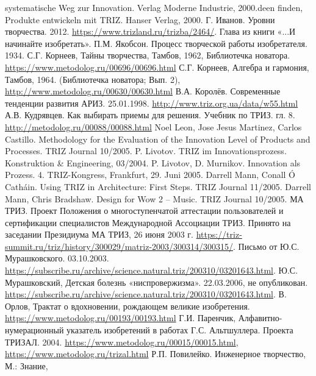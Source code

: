 \begin{thebibliography}{xxx}
  systematische Weg zur Innovation. Verlag Moderne Industrie, 2000.deen finden,
  Produkte entwickeln mit TRIZ. Hanser Verlag, 2000.
 Г. Иванов. Уровни творчества. 2012.
  \url{https://www.trizland.ru/trizba/2464/}. Глава из книги «...И начинайте
  изобретать».
  П.М. Якобсон. Процесс творческой работы изобретателя.
  1934. 
 С.Г. Корнеев, Тайны творчества, Тамбов, 1962,
  Библиотечка новатора.  \url{https://www.metodolog.ru/00696/00696.html} 
 С.Г. Корнеев, Алгебра и гармония, Тамбов, 1964.
  (Библиотечка новатора; Вып. 2),
  \url{http://www.metodolog.ru/00630/00630.html}
 В.А. Королёв. Современные тенденции развития АРИЗ.
  25.01.1998. \url{http://www.triz.org.ua/data/w55.html}
 А.В. Кудрявцев. Как выбирать приемы для решения.
  Учебник по ТРИЗ. гл. 8.  \url{http://metodolog.ru/00088/00088.html}
 Noel Leon, Jose Jesus Martinez, Carlos Castillo.
  Methodology for the Evaluation of the Innovation Level of Products and
  Processes. TRIZ Journal 10/2005.
 P. Livotov. TRIZ im Innovationsprozess. Konstruktion \&
  Engineering, 03/2004.
 P. Livotov, D. Murnikov. Innovation als Prozess. 
  4. TRIZ-Kongress, Frankfurt, 29. Juni 2005. 
 Darrell Mann, Conall Ó Catháin.  Using TRIZ in
  Architecture: First Steps. TRIZ Journal 11/2005.
 Darrell Mann, Chris Bradshaw. Design for Wow 2 – Music.
  TRIZ Journal 10/2005.
 МА ТРИЗ. Проект Положения о многоступенчатой аттестации
  пользователей и сертификации специалистов Международной Ассоциации ТРИЗ.
  Принято на заседании Президиума МА ТРИЗ, 26 июня 2003 г.
  \url{https://triz-summit.ru/triz/history/300029/matriz-2003/300314/300315/}.
 Письмо от Ю.С. Мурашковского. 03.10.2003.
  \url{https://subscribe.ru/archive/science.natural.triz/200310/03201643.html}.
 Ю.С. Мурашковский, Детская болезнь
  «ниспровержизма». 22.03.2006, не опубликован.
  \url{https://subscribe.ru/archive/science.natural.triz/200310/03201643.html}.
 В. Орлов, Трактат о вдохновении, рождающем великие
  изобретения.  \url{https://www.metodolog.ru/00193/00193.html}
 Г.И. Паренчик, Алфавитно-нумерационный указатель
  изобретений в работах Г.С. Альтшуллера.  Проекта ТРИЗАЛ. 2004.
  \url{https://www.metodolog.ru/00015/00015.html},
  \url{https://www.metodolog.ru/trizal.html}
 Р.П. Повилейко. Инженерное творчество, М.: Знание,

\end{thebibliography}
